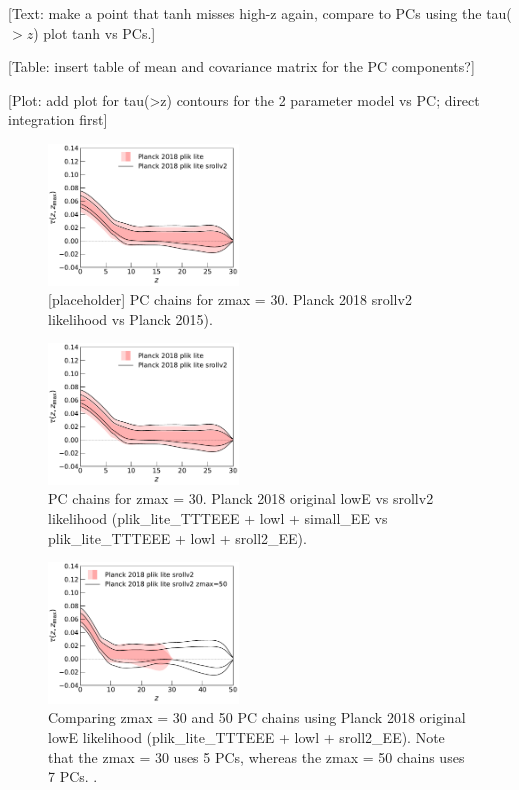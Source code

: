 \documentclass[prd,twocolumn,amsmath,amssymb,floatfix,superscriptaddress,nofootinbib]{revtex4-1}
\begin{document}
[Text: make a point that tanh misses high-z again, compare to PCs using the tau($>z$) plot tanh vs PCs.]

[Table: insert table of mean and covariance matrix for the PC components?]

[Plot: add plot for tau(>z) contours for the 2 parameter model vs PC; direct integration first]

\begin{figure}[ht]
\includegraphics[width=0.45\textwidth]{results/direct_mcmc/pl18_plots_zmax30/plot_pub_tau_gtz_dz_0p1_pl18_pc_zmax30_pliklite_post_0930_and_pl18_pc_zmax30_pliklite_srollv2_0930.pdf}
\caption{[placeholder] PC chains for zmax = 30. Planck 2018 srollv2 likelihood vs Planck 2015).
}
\label{fig:}
\end{figure}

\begin{figure}[ht]
\includegraphics[width=0.45\textwidth]{results/direct_mcmc/pl18_plots_zmax30/plot_pub_tau_gtz_dz_0p1_pl18_pc_zmax30_pliklite_post_0930_and_pl18_pc_zmax30_pliklite_srollv2_0930.pdf}
\caption{PC chains for zmax = 30. Planck 2018 original lowE vs srollv2 likelihood (plik\_lite\_TTTEEE + lowl + simall\_EE vs plik\_lite\_TTTEEE + lowl + sroll2\_EE).
}
\label{fig:}
\end{figure}

\begin{figure}[ht]
\includegraphics[width=0.45\textwidth]{results/direct_mcmc/pl18_plots_zmax30/plot_pub_tau_gtz_dz_0p1_pl18_pc_zmax30_pliklite_srollv2_0930_and_pl18_pc_zmax50_pliklite_srollv2.pdf}
\caption{Comparing zmax = 30 and 50 PC chains using Planck 2018 original lowE likelihood (plik\_lite\_TTTEEE + lowl + sroll2\_EE). Note that the zmax = 30 uses 5 PCs, whereas the zmax = 50 chains uses 7 PCs. .
}
\label{fig:}
\end{figure}
\end{document}
